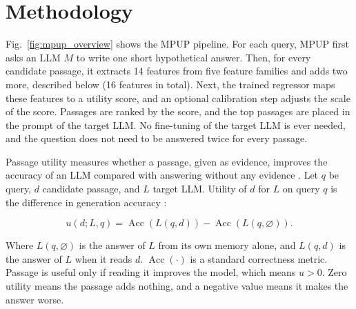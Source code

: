 \documentclass[preprint,12pt,authoryear]{elsarticle}
\begin{document}
\section{Methodology}\label{sec:method}
Fig.~\ref{fig:mpup_overview} shows the MPUP pipeline. For each query, MPUP first asks an
LLM $M$ to write one short hypothetical answer. Then, for every
candidate passage, it extracts 14 features from five feature families and adds two more, described below (16 features in total).
Next, the trained regressor maps these features to a utility score, and an
optional calibration step adjusts the scale of the score. Passages are ranked by the score, and the top passages are placed in the prompt
of the target LLM. No fine-tuning of the target LLM is ever needed, and the question does not need to be answered twice for every passage.


Passage utility measures whether a passage, given as evidence, improves
the accuracy of an LLM compared with answering without any evidence \citep{zhang2026}. Let $q$ be query, $d$ candidate passage, and $L$
target LLM. Utility of $d$ for $L$ on query $q$ is the difference
in generation accuracy \citep{zhang2026}:

\begin{equation}
    u(d;L,q)
    =
    \operatorname{Acc}(L(q,d))
    -
    \operatorname{Acc}(L(q,\varnothing)).
    \label{eq:utility}
\end{equation}

Where $L(q,\varnothing)$ is the answer of $L$ from its own memory alone,
and $L(q,d)$ is the answer of $L$ when it reads $d$.
$\operatorname{Acc}(\cdot)$ is a standard correctness metric. Passage
is useful only if reading it improves the model, which means $u>0$.
Zero utility means the passage adds nothing, and a negative value
means it makes the answer worse.
\end{document}
